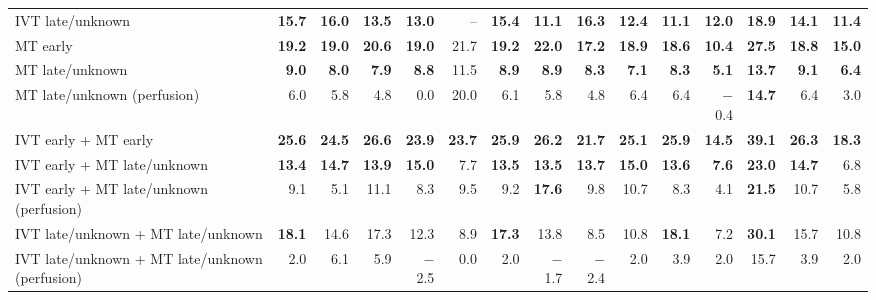 \begin{landscape}
{\begin{longtable}{p{4.9cm}rrrrrrrrrrrrrr}
IVT late/unknown & \textbf{15.7} & \textbf{16.0} & \textbf{13.5} & \textbf{13.0} & -- & \textbf{15.4} & \textbf{11.1} & \textbf{16.3} & \textbf{12.4} & \textbf{11.1} & \textbf{12.0} & \textbf{18.9} & \textbf{14.1} & \textbf{11.4} \\
MT early & \textbf{19.2} & \textbf{19.0} & \textbf{20.6} & \textbf{19.0} & 21.7 & \textbf{19.2} & \textbf{22.0} & \textbf{17.2} & \textbf{18.9} & \textbf{18.6} & \textbf{10.4} & \textbf{27.5} & \textbf{18.8} & \textbf{15.0} \\
MT late/unknown & \textbf{9.0} & \textbf{8.0} & \textbf{7.9} & \textbf{8.8} & 11.5 & \textbf{8.9} & \textbf{8.9} & \textbf{8.3} & \textbf{7.1} & \textbf{8.3} & \textbf{5.1} & \textbf{13.7} & \textbf{9.1} & \textbf{6.4} \\
MT late/unknown (perfusion) & 6.0 & 5.8 & 4.8 & 0.0 & 20.0 & 6.1 & 5.8 & 4.8 & 6.4 & 6.4 & $-$0.4 & \textbf{14.7} & 6.4 & 3.0 \\
IVT early + MT early & \textbf{25.6} & \textbf{24.5} & \textbf{26.6} & \textbf{23.9} & \textbf{23.7} & \textbf{25.9} & \textbf{26.2} & \textbf{21.7} & \textbf{25.1} & \textbf{25.9} & \textbf{14.5} & \textbf{39.1} & \textbf{26.3} & \textbf{18.3} \\
IVT early + MT late/unknown & \textbf{13.4} & \textbf{14.7} & \textbf{13.9} & \textbf{15.0} & 7.7 & \textbf{13.5} & \textbf{13.5} & \textbf{13.7} & \textbf{15.0} & \textbf{13.6} & \textbf{7.6} & \textbf{23.0} & \textbf{14.7} & 6.8 \\
IVT early + MT late/unknown (perfusion) & 9.1 & 5.1 & 11.1 & 8.3 & 9.5 & 9.2 & \textbf{17.6} & 9.8 & 10.7 & 8.3 & 4.1 & \textbf{21.5} & 10.7 & 5.8 \\
IVT late/unknown + MT late/unknown & \textbf{18.1} & 14.6 & 17.3 & 12.3 & 8.9 & \textbf{17.3} & 13.8 & 8.5 & 10.8 & \textbf{18.1} & 7.2 & \textbf{30.1} & 15.7 & 10.8 \\
IVT late/unknown + MT late/unknown (perfusion) & 2.0 & 6.1 & 5.9 & $-$2.5 & 0.0 & 2.0 & $-$1.7 & $-$2.4 & 2.0 & 3.9 & 2.0 & 15.7 & 3.9 & 2.0 \\
\end{longtable}
\vspace{-0.5\baselineskip}
}
\end{landscape}

